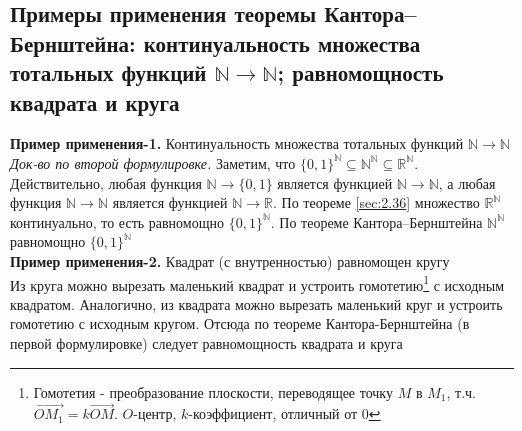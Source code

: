 \documentclass[a4paper]{article}
\begin{document}
\subsection{Примеры применения теоремы Кантора–Бернштейна: континуальность множества тотальных функций $\mathbb{N}\rightarrow\mathbb{N}$; равномощность квадрата и круга}
\textbf{Пример применения-1.} Континуальность множества тотальных функций $\mathbb{N}\rightarrow\mathbb{N}$\\[2mm]
 \textit{Док-во по второй формулировке.} Заметим, что $\{0,1\}^{\mathbb{N}}\subseteq\mathbb{N}^{\mathbb{N}}\subseteq\mathbb{R}^{\mathbb{N}}$. Действительно, любая функция $\mathbb{N}\rightarrow \{0,1\}$ является функцией $\mathbb{N}\rightarrow\mathbb{N}$, а любая функция $\mathbb{N}\rightarrow\mathbb{N}$ является функцией $\mathbb{N}\rightarrow\mathbb{R}$. По теореме \ref{sec:2.36} множество $\mathbb{R}^{\mathbb{N}}$ континуально, то есть равномощно $\{0,1\}^{\mathbb{N}}$. По теореме Кантора–Бернштейна $\mathbb{N}^{\mathbb{N}}$ равномощно $\{0, 1\}^{\mathbb{N}}$\\[2mm]
\textbf{Пример применения-2.} Квадрат (с внутренностью) равномощен кругу\\[2mm]
 Из круга можно вырезать маленький квадрат и устроить гомотетию\footnote{Гомотетия - преобразование плоскости, переводящее точку $M$ в $M_1$, т.ч. $\overrightarrow{OM_1}=k\overrightarrow{OM}$. $O$-центр, $k$-коэффициент, отличный от 0} с исходным квадратом. Аналогично, из квадрата можно вырезать маленький круг и устроить гомотетию с исходным кругом. Отсюда по теореме Кантора-Бернштейна (в первой формулировке) следует равномощность квадрата и круга
\end{document}
